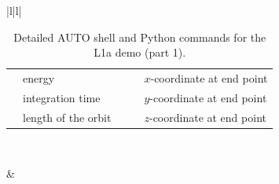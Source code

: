 \documentclass[12pt]{report}
\begin{document}
\begin{table}[htbp]
\begin{center}
\begin{tabular}{|l|l|}
{                \begin{tabular}{l@{=}lll@{=}l}
                  \parf{PAR(3)}  & energy & &
                  \parf{PAR(21)} & $x$-coordinate at end point\\
                  \parf{PAR(11)} & integration time & &
                  \parf{PAR(22)} & $y$-coordinate at end point\\
                  \parf{PAR(12)} & length of the orbit & &
                  \parf{PAR(23)} & $z$-coordinate at end point
                \end{tabular}
              }\\
\hline

		&  \\
\\
\hline
\end{tabular}
\end{center}
\caption{Detailed AUTO shell and Python commands for the L1a demo
  (part 1).}
\label{tbl:demo_l1a1}
\end{table}
\end{document}
